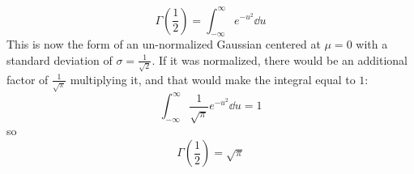 \documentclass[a4paper,twoside]{article}
\begin{document}
\begin{problem}
\begin{equation}
            \Gamma\left( \frac{1}{2} \right) = \int_{- \infty}^{\infty} e^{- u^2} \dd{u}
        \end{equation}
        This is now the form of an un-normalized Gaussian centered at $ \mu = 0 $ with a standard deviation of $ \sigma = \frac{1}{\sqrt{2}} $. If it was normalized, there would be an additional factor of $ \frac{1}{\sqrt{\pi}} $ multiplying it, and that would make the integral equal to $ 1 $:
        \begin{equation}
            \int_{- \infty}^{\infty} \frac{1}{\sqrt{\pi}} e^{- u^2} \dd{u} = 1
        \end{equation}
        so
        \begin{equation}
            \Gamma\left( \frac{1}{2} \right) = \sqrt{\pi}
        \end{equation}
\end{problem}
\end{document}
